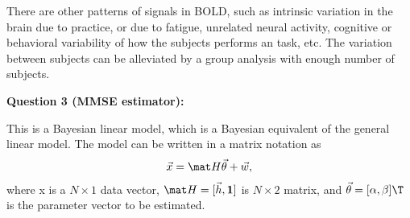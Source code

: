 \documentclass[12pt]{article}
\begin{document}
There are other patterns of signals in BOLD, such as intrinsic variation in the
brain due to practice, or due to fatigue, unrelated neural activity, cognitive
or behavioral variability of how the subjects performs an task, etc. The
variation between subjects can be alleviated by a group analysis with enough
number of subjects.

\newpage
\textbf{Question 3 (MMSE estimator):}

This is a Bayesian linear model, which is a Bayesian equivalent of the general
linear model. The model can be written in a matrix notation as
\begin{equation*}
\vec x = \mat H \vec \theta + \vec w,
\end{equation*}
where x is a $N\times 1$ data vector, $\mat H = [\vec h, \mathbf{1}]$ is
$N\times 2$ matrix, and $\vec \theta = [\alpha, \beta]\T$ is the parameter
vector to be estimated.
\end{document}
